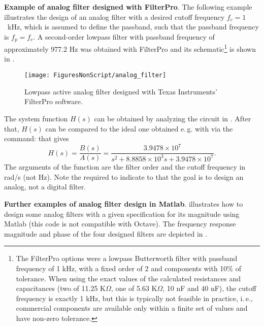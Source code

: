 \bExample \textbf{Example of analog filter designed with FilterPro}.
The following example illustrates the design of an analog filter with a desired cutoff frequency $f_c=1$~kHz, which is assumed to define the passband, such that the passband frequency is $f_p = f_c$. A second-order lowpass filter with passband frequency of approximately 977.2 Hz was obtained with FilterPro and its schematic\footnote{The FilterPro  options were a lowpass Butterworth filter with passband frequency of 1 kHz, with a fixed order of 2 and components with 10\% of tolerance. When using the exact values of the calculated resistances and capacitances (two of 11.25 K$\Omega$, one of 5.63 K$\Omega$, 10 nF and 40 nF), the cutoff frequency is exactly 1 kHz, but this is typically not feasible in practice, i.\,e., commercial components are available only within a finite set of values and have non-zero tolerance.} is shown in .

\begin{figure}
\centering
\texttt{[image: FiguresNonScript/analog\_filter]}
\caption{Lowpass active analog filter designed with Texas Instruments' FilterPro software.\label{fig:analog_filter}}
\end{figure}

The system function $H(s)$ can be obtained by analyzing the circuit in . After that, $H(s)$ can be compared to the ideal one obtained e.\,g. with {\matlab} via the command:
that gives
\begin{equation}
H(s) = \frac{B(s)}{A(s)} = \frac{3.9478\times 10^7}{s^{2}  + 8.8858 \times 10^3 s  + 3.9478\times 10^7}.
\label{eq:butter_analog}
\end{equation}
The arguments of the function  are the filter order and the cutoff frequency in rad/s (not Hz). Note the required  to indicate to {\matlab} that the goal is to design an analog, not a digital filter. 
\eExample 


\bExample \textbf{Further examples of analog filter design in Matlab}.
\label{ex:analogFilterDesigns}
 illustrates how to design some analog filters with a given specification for its magnitude
using Matlab (this code is not compatible with Octave).
The frequency response magnitude and phase of the four designed filters are depicted in .


